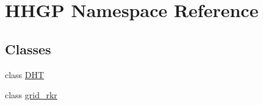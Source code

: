 \hypertarget{namespace_h_h_g_p}{}\section{H\+H\+GP Namespace Reference}
\label{namespace_h_h_g_p}
\subsection*{Classes}
\begin{DoxyCompactItemize}
\item 
class \hyperlink{class_h_h_g_p_1_1_d_h_t}{D\+HT}
\item 
class \hyperlink{class_h_h_g_p_1_1grid__rkr}{grid\+\_\+rkr}
\end{DoxyCompactItemize}

